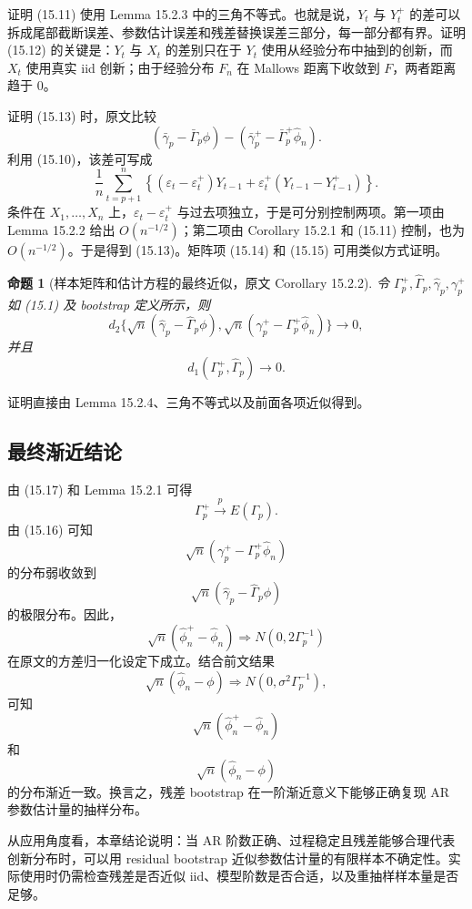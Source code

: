 \documentclass[11pt,a4paper,openany]{ctexbook}
\newtheorem{proposition}{命题}[section]
\begin{document}
证明 (15.11) 使用 Lemma 15.2.3 中的三角不等式。也就是说，\(Y_t\) 与 \(Y_t^+\) 的差可以拆成尾部截断误差、参数估计误差和残差替换误差三部分，每一部分都有界。证明 (15.12) 的关键是：\(Y_t\) 与 \(X_t\) 的差别只在于 \(Y_t\) 使用从经验分布中抽到的创新，而 \(X_t\) 使用真实 iid 创新；由于经验分布 \(F_n\) 在 Mallows 距离下收敛到 \(F\)，两者距离趋于 0。

证明 (15.13) 时，原文比较
\[
  (\bar\gamma_p-\bar\Gamma_p\phi)
  -(\bar\gamma_p^+-\bar\Gamma_p^+\hat\phi_n).
\]
利用 (15.10)，该差可写成
\[
  \frac1n\sum_{t=p+1}^n
  \left\{(\varepsilon_t-\varepsilon_t^+)Y_{t-1}
  +\varepsilon_t^+(Y_{t-1}-Y_{t-1}^+)\right\}.
\]
条件在 \(X_1,\ldots,X_n\) 上，\(\varepsilon_t-\varepsilon_t^+\) 与过去项独立，于是可分别控制两项。第一项由 Lemma 15.2.2 给出 \(O(n^{-1/2})\)；第二项由 Corollary 15.2.1 和 (15.11) 控制，也为 \(O(n^{-1/2})\)。于是得到 (15.13)。矩阵项 (15.14) 和 (15.15) 可用类似方式证明。

\begin{proposition}[样本矩阵和估计方程的最终近似，原文 Corollary 15.2.2]
令 \(\Gamma_p^+,\hat\Gamma_p,\hat\gamma_p,\gamma_p^+\) 如 (15.1) 及 bootstrap 定义所示，则
\[
  d_2\{\sqrt n(\hat\gamma_p-\hat\Gamma_p\phi),
        \sqrt n(\gamma_p^+-\Gamma_p^+\hat\phi_n)\}\to0,
  \tag{15.16}
\]
并且
\[
  d_1(\Gamma_p^+,\hat\Gamma_p)\to0.
  \tag{15.17}
\]
\end{proposition}

证明直接由 Lemma 15.2.4、三角不等式以及前面各项近似得到。

\subsection{最终渐近结论}

由 (15.17) 和 Lemma 15.2.1 可得
\[
  \Gamma_p^+\xrightarrow{p}E(\Gamma_p).
\]
由 (15.16) 可知
\[
  \sqrt n(\gamma_p^+-\Gamma_p^+\hat\phi_n)
\]
的分布弱收敛到
\[
  \sqrt n(\hat\gamma_p-\hat\Gamma_p\phi)
\]
的极限分布。因此，
\[
  \sqrt n(\hat\phi_n^+-\hat\phi_n)
  \Rightarrow N(0,2\Gamma_p^{-1})
\]
在原文的方差归一化设定下成立。结合前文结果
\[
  \sqrt n(\hat\phi_n-\phi)
  \Rightarrow N(0,\sigma^2\Gamma_p^{-1}),
\]
可知
\[
  \sqrt n(\hat\phi_n^+-\hat\phi_n)
\]
和
\[
  \sqrt n(\hat\phi_n-\phi)
\]
的分布渐近一致。换言之，残差 bootstrap 在一阶渐近意义下能够正确复现 AR 参数估计量的抽样分布。

从应用角度看，本章结论说明：当 AR 阶数正确、过程稳定且残差能够合理代表创新分布时，可以用 residual bootstrap 近似参数估计量的有限样本不确定性。实际使用时仍需检查残差是否近似 iid、模型阶数是否合适，以及重抽样样本量是否足够。
\end{document}

